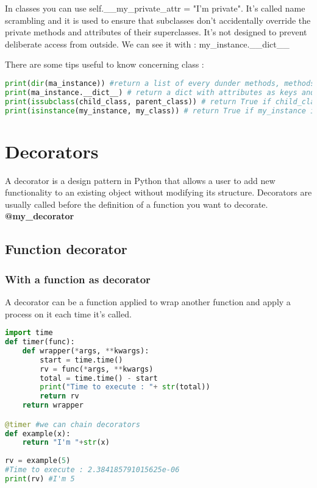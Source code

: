 \documentclass[a4paper, 12pt, titlepage]{scrartcl} %
\begin{document}
\vspace{5mm}

In classes you can use self.\_\_my\_private\_attr = "I'm private".
It's called name scrambling and it is used to ensure that subclasses don't accidentally override the private methods and attributes of their superclasses. It's not designed to prevent deliberate access from outside. We can see it with : my\_instance.\_\_dict\_\_

\vspace{5mm}

There are some tips useful to know concerning class :
\begin{lstlisting}[language=Python]
print(dir(ma_instance)) #return a list of every dunder methods, methods and attributes from the class.
print(ma_instance.__dict__) # return a dict with attributes as keys and their value. associated.
print(issubclass(child_class, parent_class)) # return True if child_class is the child of parent_class.
print(isinstance(my_instance, my_class)) # return True if my_instance is an instance from my_class.
\end{lstlisting} \vspace{5mm}

\newpage
\section{Decorators}
A decorator is a design pattern in Python that allows a user to add new functionality to an existing object without modifying its structure. Decorators are usually called before the definition of a function you want to decorate. \textbf{@my\_decorator}

\subsection{Function decorator}

\subsubsection{With a function as decorator}
A decorator can be a function applied to wrap another function and apply a process on it each time it's called.
\begin{lstlisting}[language=Python]
import time
def timer(func):
	def wrapper(*args, **kwargs):
		start = time.time()
		rv = func(*args, **kwargs)
		total = time.time() - start
		print("Time to execute : "+ str(total))
		return rv
	return wrapper

@timer #we can chain decorators
def example(x):
	return "I'm "+str(x)
	
rv = example(5)
#Time to execute : 2.384185791015625e-06
print(rv) #I'm 5
\end{lstlisting} \vspace{5mm}
\end{document}
